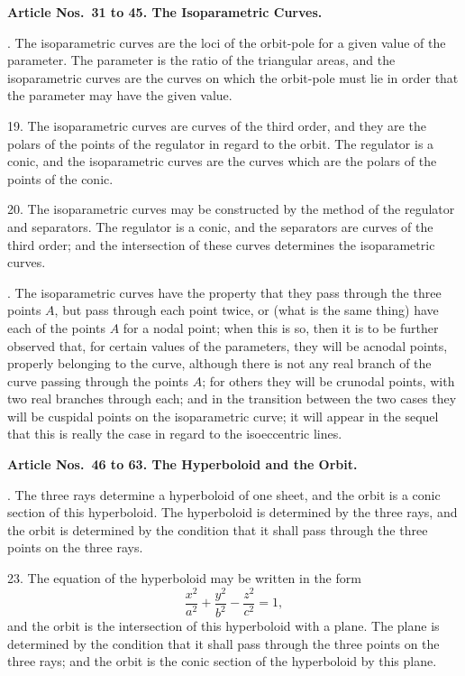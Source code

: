 \documentclass[11pt,a4paper]{article}
\theoremstyle{definition}
\begin{document}
\newpage
\noindent
\textbf{Article Nos.~31 to 45. The Isoparametric Curves.}

\smallskip

. The isoparametric curves are the loci of the orbit-pole for a given value of the
parameter. The parameter is the ratio of the triangular areas, and the isoparametric
curves are the curves on which the orbit-pole must lie in order that the parameter may
have the given value.

19. The isoparametric curves are curves of the third order, and they are the polars
of the points of the regulator in regard to the orbit. The regulator is a conic, and the
isoparametric curves are the curves which are the polars of the points of the conic.

20. The isoparametric curves may be constructed by the method of the regulator and
separators. The regulator is a conic, and the separators are curves of the third order;
and the intersection of these curves determines the isoparametric curves.

\newpage
{}. The isoparametric curves have the property that they pass through the three
points $A$, but pass through each point twice, or (what is the same thing) have each of the
points $A$ for a nodal point; when this is so, then it is to be further observed that, for
certain values of the parameters, they will be acnodal points, properly belonging to the
curve, although there is not any real branch of the curve passing through the points $A$;
for others they will be crunodal points, with two real branches through each; and in the
transition between the two cases they will be cuspidal points on the isoparametric curve;
it will appear in the sequel that this is really the case in regard to the isoeccentric lines.

\noindent
\textbf{Article Nos.~46 to 63. The Hyperboloid and the Orbit.}

\smallskip

. The three rays determine a hyperboloid of one sheet, and the orbit is a conic
section of this hyperboloid. The hyperboloid is determined by the three rays, and the
orbit is determined by the condition that it shall pass through the three points on the
three rays.

23. The equation of the hyperboloid may be written in the form
\[
\frac{x^2}{a^2} + \frac{y^2}{b^2} - \frac{z^2}{c^2} = 1,
\]
and the orbit is the intersection of this hyperboloid with a plane. The plane is determined
by the condition that it shall pass through the three points on the three rays; and the
orbit is the conic section of the hyperboloid by this plane.
\end{document}

